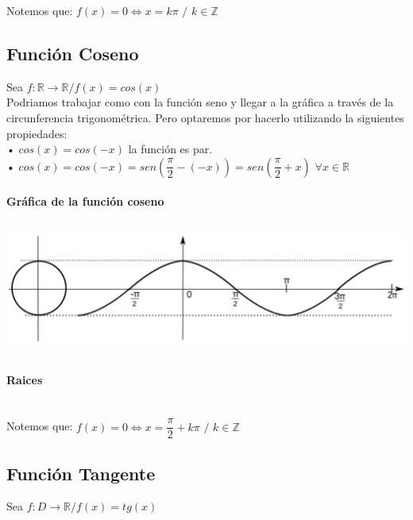 Notemos que: $f(x)=0 \Leftrightarrow x= k \pi$ $/$ $k\in \mathbb{Z}$
\subsection{Función Coseno}

Sea $f: \mathbb{R} \longrightarrow \mathbb{R} / f(x)= cos(x)$ \\

Podriamos trabajar como con la función seno y llegar a la gráfica a través de la circunferencia trigonométrica. Pero optaremos por hacerlo utilizando la siguientes propiedades:\\

• $cos(x)=cos(-x)$ la función es par.\\

• $cos(x) = cos(-x) = sen \left(\dfrac{\pi}{2} -(-x)\right) = sen \left(\dfrac{\pi}{2} + x \right)$ \quad $\forall x \in \mathbb{R}$\\

\paragraph{Gráfica de la función coseno}
\begin{center}
\includegraphics[height=4.3cm,width=15cm]{cos.eps} 
\end{center}

\paragraph{Raices}
\qquad\\

Notemos que: $f(x)=0 \Leftrightarrow x= \dfrac{\pi}{2} + k \pi$ $/$ $k\in \mathbb{Z}$
\subsection{Función Tangente}

Sea $f: D \longrightarrow \mathbb{R} / f(x)= tg(x)$ \\

